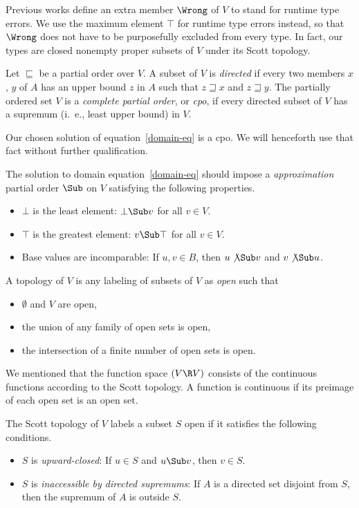 Previous works define an extra member $\Wrong$ of $V$ to stand
for runtime type errors. We use the maximum element $\top$ for
runtime type errors instead, so that $\Wrong$ does not have to be
purposefully excluded from every type. In fact, our types are
closed nonempty proper subsets of $V$ under its Scott topology.


Let $\sqsubseteq$ be a partial order over $V$. A subset of $V$ is
\emph{directed} if every two members $x$, $y$ of $A$ has an upper
bound $z$ in $A$ such that $z\sqsupseteq x$ and $z\sqsupseteq y$.
The partially ordered set $V$ is a \emph{complete partial order},
or \emph{cpo}, if every directed subset of $V$ has a supremum
(i.~e., least upper bound) in $V$.

Our chosen solution of equation~\eqref{domain-eq} is a cpo. We
will henceforth use that fact without further qualification.


The solution to domain equation~\eqref{domain-eq} should impose a
\emph{approximation} partial order $\Sub$ on $V$ satisfying the
following properties.
\begin{itemize}
\item $\bot$ is the least element: $\bot\Sub v$ for all $v\in V$.
\item $\top$ is the greatest element: $v\Sub\top$ for all $v\in
V$.
\item Base values are incomparable: If $u,v\in B$, then
$u\not\Sub v$ and $v\not\Sub u$.
\end{itemize}
A topology of $V$ is any labeling of subsets of $V$ as
\emph{open} such that
\begin{itemize}
\item $\emptyset$ and $V$ are open,
\item the union of any family of open sets is open,
\item the intersection of a finite number of open sets is open.
\end{itemize}
We mentioned that the function space $(V\R V)$ consists of the
continuous functions according to the Scott topology. A function
is continuous if its preimage of each open set is an open set.

\begin{samepage}
The Scott topology of $V$ labels a subset $S$ open if it
satisfies the following conditions.
\begin{itemize}
\item $S$ is \emph{upward-closed}: If $u\in S$ and $u\Sub v$,
then $v\in S$.
\item $S$ is \emph{inaccessible by directed supremums}: If $A$ is
a directed set disjoint from $S$, then the supremum of $A$ is
outside $S$.
\end{itemize}
\end{samepage}

